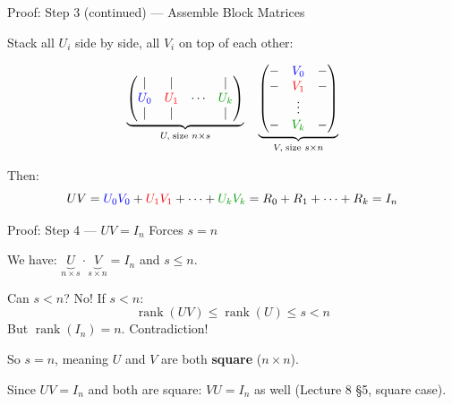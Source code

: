 \documentclass[10pt]{beamer}
\theoremstyle{definition}
\newcommand{\x}[1]{\alert{\textbf{#1}}}
\newcommand{\gn}[1]{{\color{green!60!black}#1}}       %
\newcommand{\rd}[1]{{\color{red}#1}}                  %
\newcommand{\bl}[1]{{\color{blue}#1}}                 %
\begin{document}
\begin{frame}{Proof: Step 3 (continued) --- Assemble Block Matrices}

Stack all $U_i$ side by side, all $V_i$ on top of each other:

$$\underbrace{\begin{pmatrix}
| & | & & | \\
\bl{U_0} & \rd{U_1} & \cdots & \gn{U_k} \\
| & | & & |
\end{pmatrix}}_{U, \;\text{size } n \times s} \quad
\underbrace{\begin{pmatrix}
- & \bl{V_0} & - \\
- & \rd{V_1} & - \\
& \vdots & \\
- & \gn{V_k} & -
\end{pmatrix}}_{V, \;\text{size } s \times n}$$

\vspace{0.3em}

Then:
$$UV = \bl{U_0}\bl{V_0} + \rd{U_1}\rd{V_1} + \cdots + \gn{U_k}\gn{V_k} = R_0 + R_1 + \cdots + R_k = I_n$$

\end{frame}


\begin{frame}{Proof: Step 4 --- $UV = I_n$ Forces $s = n$}

We have: $\underbrace{U}_{n \times s} \cdot \underbrace{V}_{s \times n} = I_n$ and $s \leq n$.

\vspace{0.5em}

Can $s < n$? No! If $s < n$:
$$\operatorname{rank}(UV) \leq \operatorname{rank}(U) \leq s < n$$
But $\operatorname{rank}(I_n) = n$. Contradiction!

\vspace{0.5em}

So $s = n$, meaning $U$ and $V$ are both \x{square} ($n \times n$).

\vspace{0.5em}

Since $UV = I_n$ and both are square: $VU = I_n$ as well (Lecture 8 \S5, square case).

\end{frame}
\end{document}
